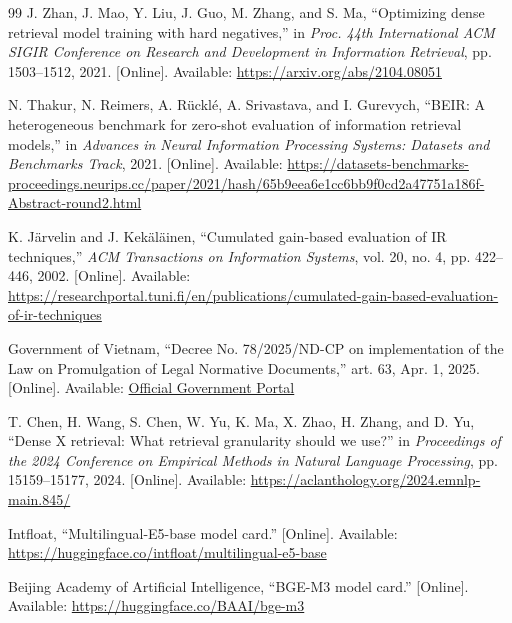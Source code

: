 \begin{thebibliography}{99}
J. Zhan, J. Mao, Y. Liu, J. Guo, M. Zhang, and S. Ma, ``Optimizing dense retrieval model training with hard negatives,'' in \emph{Proc. 44th International ACM SIGIR Conference on Research and Development in Information Retrieval}, pp. 1503--1512, 2021. [Online]. Available: \href{https://arxiv.org/abs/2104.08051}{https://arxiv.org/abs/2104.08051}

N. Thakur, N. Reimers, A. Rücklé, A. Srivastava, and I. Gurevych, ``BEIR: A heterogeneous benchmark for zero-shot evaluation of information retrieval models,'' in \emph{Advances in Neural Information Processing Systems: Datasets and Benchmarks Track}, 2021. [Online]. Available: \href{https://datasets-benchmarks-proceedings.neurips.cc/paper/2021/hash/65b9eea6e1cc6bb9f0cd2a47751a186f-Abstract-round2.html}{https://datasets-benchmarks-proceedings.neurips.cc/paper/2021/hash/65b9eea6e1cc6bb9f0cd2a47751a186f-Abstract-round2.html}

K. Järvelin and J. Kekäläinen, ``Cumulated gain-based evaluation of IR techniques,'' \emph{ACM Transactions on Information Systems}, vol. 20, no. 4, pp. 422--446, 2002. [Online]. Available: \href{https://researchportal.tuni.fi/en/publications/cumulated-gain-based-evaluation-of-ir-techniques}{https://researchportal.tuni.fi/en/publications/cumulated-gain-based-evaluation-of-ir-techniques}

Government of Vietnam, ``Decree No. 78/2025/ND-CP on implementation of the Law on Promulgation of Legal Normative Documents,'' art. 63, Apr. 1, 2025. [Online]. Available: \href{https://xaydungchinhsach.chinhphu.vn/toan-van-nghi-dinh-78-2025-nd-cp-quy-dinh-chi-tiet-mot-so-dieu-luat-ban-hanh-van-ban-quy-pham-phap-luat-119250408202647634.htm}{Official Government Portal}

T. Chen, H. Wang, S. Chen, W. Yu, K. Ma, X. Zhao, H. Zhang, and D. Yu, ``Dense X retrieval: What retrieval granularity should we use?'' in \emph{Proceedings of the 2024 Conference on Empirical Methods in Natural Language Processing}, pp. 15159--15177, 2024. [Online]. Available: \href{https://aclanthology.org/2024.emnlp-main.845/}{https://aclanthology.org/2024.emnlp-main.845/}

Intfloat, ``Multilingual-E5-base model card.'' [Online]. Available: \href{https://huggingface.co/intfloat/multilingual-e5-base}{https://huggingface.co/intfloat/multilingual-e5-base}

Beijing Academy of Artificial Intelligence, ``BGE-M3 model card.'' [Online]. Available: \href{https://huggingface.co/BAAI/bge-m3}{https://huggingface.co/BAAI/bge-m3}


\end{thebibliography}
